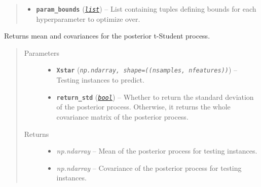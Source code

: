 \documentclass[letterpaper,10pt,english]{sphinxmanual}
\begin{document}
\begin{fulllineitems}
\begin{fulllineitems}
\begin{quote}
\begin{description}
\begin{itemize}
\item {} 
\textbf{\texttt{param\_bounds}} (\href{https://docs.python.org/2/library/functions.html\#list}{\emph{\texttt{list}}}) -- List containing tuples defining bounds for each hyperparameter to optimize over.

\end{itemize}

\end{description}\end{quote}

\end{fulllineitems}


\begin{fulllineitems}
\label{pyGPGO.surrogates.tStudentProcess:pyGPGO.surrogates.tStudentProcess.tStudentProcess.predict}
Returns mean and covariances for the posterior t-Student process.
\begin{quote}\begin{description}
\item[{Parameters}] \leavevmode\begin{itemize}
\item {} 
\textbf{\texttt{Xstar}} (\emph{\texttt{np.ndarray, shape=((nsamples, nfeatures))}}) -- Testing instances to predict.

\item {} 
\textbf{\texttt{return\_std}} (\href{https://docs.python.org/2/library/functions.html\#bool}{\emph{\texttt{bool}}}) -- Whether to return the standard deviation of the posterior process. Otherwise,
it returns the whole covariance matrix of the posterior process.

\end{itemize}

\item[{Returns}] \leavevmode
\begin{itemize}
\item {} 
\emph{np.ndarray} -- Mean of the posterior process for testing instances.

\item {} 
\emph{np.ndarray} -- Covariance of the posterior process for testing instances.

\end{itemize}


\end{description}\end{quote}


\end{fulllineitems}
\end{fulllineitems}
\end{document}
